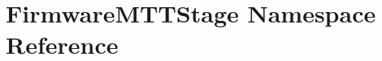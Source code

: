 \hypertarget{namespaceFirmwareMTTStage}{\section{Firmware\-M\-T\-T\-Stage Namespace Reference}
\label{namespaceFirmwareMTTStage}
}
